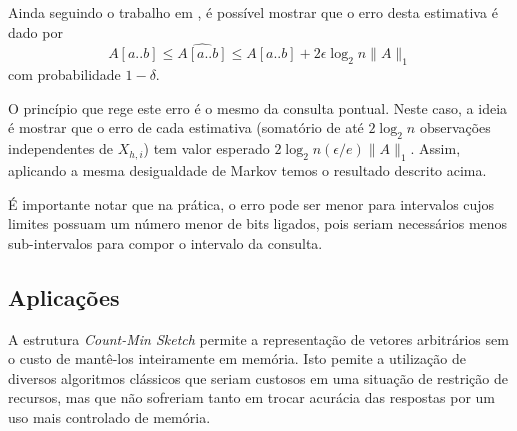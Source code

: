 Ainda seguindo o trabalho em \cite{cormode2005improved}, é possível mostrar que o erro desta estimativa é dado por
\[
    A[a..b] \leq \widehat{A[a..b]} \leq A[a..b] + 2  \epsilon \log_2 n \lVert A \rVert_1
\]
com probabilidade $1-\delta$.

O princípio que rege este erro é o mesmo da consulta pontual. Neste caso, a ideia é mostrar que o erro de cada estimativa (somatório de até $2\log_2 n$ observações independentes de $X_{h,i}$) tem valor esperado $2 \log_2 n (\epsilon/e) \lVert A \rVert_1$. Assim, aplicando a mesma desigualdade de Markov temos o resultado descrito acima. 

É importante notar que na prática, o erro pode ser menor para intervalos cujos limites possuam um número menor de bits ligados, pois seriam necessários menos sub-intervalos para compor o intervalo da consulta.

\subsection{Aplicações}

A estrutura \emph{Count-Min Sketch} permite a representação de vetores arbitrários sem o custo de mantê-los inteiramente em memória. Isto pemite a utilização de diversos algoritmos clássicos que seriam custosos em uma situação de restrição de recursos, mas que não sofreriam tanto em trocar acurácia das respostas por um uso mais controlado de memória.

